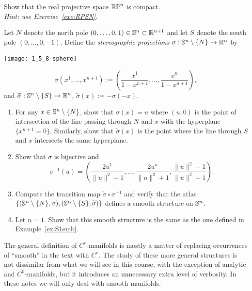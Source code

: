 \begin{exercise}
  Show that the real projective space $\mathbb{RP}^n$ is compact.\\
  \textit{\small Hint: use Exercise~\ref{exe:RPSN}.}
\end{exercise}

\begin{exercise}\label{ex:stereo}
  Let $N$ denote the north pole $(0,\ldots,0,1)\in\mathbb{S}^n\subset\mathbb{R}^{n+1}$ and let $S$ denote the south pole $(0,\ldots,0,-1)$.
  Define the \emph{stereographic projections} $\sigma:\mathbb{S}^n\setminus\{N\}\to \mathbb{R}^n$ by
  \begin{marginfigure}
    \texttt{[image: 1\_5\_8-sphere]}
  \end{marginfigure}
  \begin{equation}
    \sigma(x^1,\ldots,x^{n+1}) := \left(\frac{x^1}{1-x^{n+1}},\ldots,\frac{x^n}{1-x^{n+1}}\right),
  \end{equation}
  and $\widetilde\sigma:\mathbb{S}^n\setminus\{S\}\to \mathbb{R}^n$, $\widetilde\sigma(x) := -\sigma(-x)$.
  \begin{enumerate}
    \item For any $x\in\mathbb{S}^n\setminus\{N\}$, show that $\sigma(x)=u$ where $(u,0)$ is the point of intersection of the line passing through $N$ and $x$ with the hyperplane $\{x^{n+1}=0\}$.
    Similarly, show that $\widetilde\sigma(x)$ is the point where the line through $S$ and $x$ intersects the same hyperplane.
    \item Show that $\sigma$ is bijective and
    \begin{equation}
      \sigma^{-1}(u) = \left(\frac{2 u^1}{\|u\|^2+1}, \ldots,\frac{2 u^n}{\|u\|^2+1},\frac{\|u\|^2-1}{\|u\|^2+1}\right).
    \end{equation}
    \item Compute the transition map $\widetilde\sigma\circ\sigma^{-1}$ and verify that the atlas $\{(\mathbb{S}^n\setminus\{N\},\sigma),(\mathbb{S}^n\setminus\{S\},\widetilde\sigma)\}$ defines a smooth structure on $\mathbb{S}^n$.
    \item Let $n=1$. Show that this smooth structure is the same as the one defined in Example~\ref{ex:S1emb}.
  \end{enumerate}
\end{exercise}

\begin{tcolorbox}
  The general definition of $C^r$-manifolds is mostly a matter of replacing occurrences of ``smooth'' in the text with $C^r$.
  The study of these more general structures is not dissimilar from what we will see in this course, with the exception of analytic and $C^0$-manifolds, but it introduces an unnecessary extra level of verbosity.
  In these notes we will only deal with smooth manifolds.
\end{tcolorbox}

